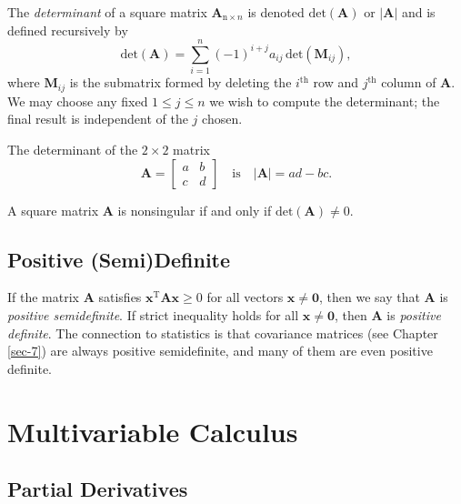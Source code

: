 \documentclass[captions=tableheading]{scrbook}
\begin{document}
\begin{example}
\begin{defn}
The \emph{determinant} of a square matrix \(\mathbf{A}_{\mathrm{n}\times n}\) is denoted \(\mathrm{det}(\mathbf{A})\) or \(|\mathbf{A}|\) and is defined recursively by
\begin{equation}
\mathrm{det}(\mathbf{A})=\sum_{i=1}^{n}(-1)^{i+j}a_{ij}\,\mathrm{det}(\mathbf{M}_{ij}),
\end{equation}
where \(\mathbf{M}_{ij}\) is the submatrix formed by deleting the \(i^{\mathrm{th}}\) row and \(j^{\mathrm{th}}\) column of \(\mathbf{A}\). We may choose any fixed \(1\leq j\leq n\) we wish to compute the determinant; the final result is independent of the \(j\) chosen.
\end{defn}
\begin{fact}
The determinant of the \(2\times2\) matrix
\begin{equation}
\mathbf{A}=\begin{bmatrix}a & b\\
c & d\end{bmatrix}\quad\mbox{is}\quad|\mathbf{A}|=ad-bc.
\end{equation}
\end{fact}

\begin{fact}
A square matrix \(\mathbf{A}\) is nonsingular if and only if \(\mathrm{det}(\mathbf{A})\neq0\).
\end{fact}
\subsection{Positive (Semi)Definite}
\label{sec-21-5-3}

If the matrix \(\mathbf{A}\) satisfies \(\mathbf{x^{\mathrm{T}}}\mathbf{A}\mathbf{x}\geq0\) for all vectors \(\mathbf{x}\neq\mathbf{0}\), then we say that \(\mathbf{A}\) is \emph{positive semidefinite}. If strict inequality holds for all \(\mathbf{x}\neq\mathbf{0}\), then \(\mathbf{A}\) is \emph{positive definite}. The connection to statistics is that covariance matrices (see Chapter \ref{sec-7}) are always positive semidefinite, and many of them are even positive definite.
\section{Multivariable Calculus}
\label{sec-21-6}
\label{sec-Multivariable-Calculus}
\subsection{Partial Derivatives}
\label{sec-21-6-1}


\end{example}
\end{document}
